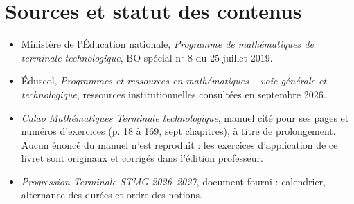 \chapter{Sources et statut des contenus}
\begin{itemize}
\item Ministère de l'Éducation nationale, \emph{Programme de mathématiques de terminale technologique}, BO spécial n° 8 du 25 juillet 2019.
\item Éduscol, \emph{Programmes et ressources en mathématiques -- voie générale et technologique}, ressources institutionnelles consultées en septembre 2026.
\item \emph{Calao Mathématiques Terminale technologique}, manuel cité pour ses pages et numéros d'exercices (p. 18 à 169, sept chapitres), à titre de prolongement. Aucun énoncé du manuel n'est reproduit : les exercices d'application de ce livret sont originaux et corrigés dans l'édition professeur.
\item \emph{Progression Terminale STMG 2026--2027}, document fourni : calendrier, alternance des durées et ordre des notions.
\end{itemize}
